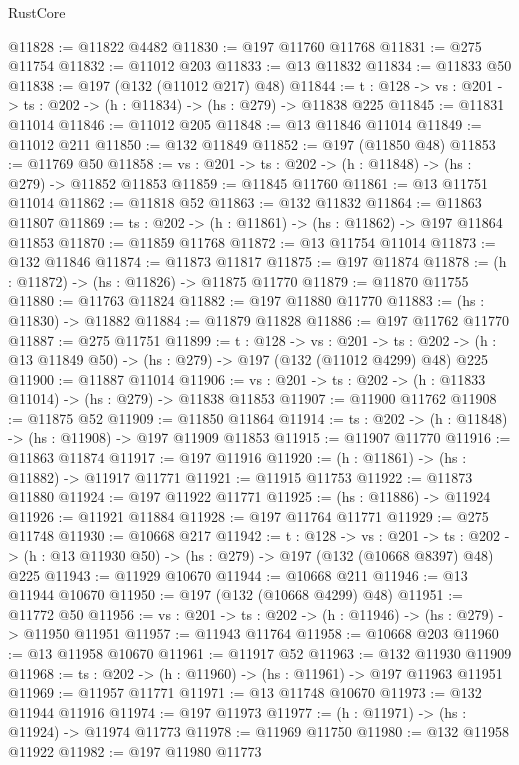 \begin{lexlean}{RustCore}
\begin{coremodule}
@11828 := @11822 @4482
@11830 := @197 @11760 @11768
@11831 := @275 @11754
@11832 := @11012 @203
@11833 := @13 @11832
@11834 := @11833 @50
@11838 := @197 (@132 (@11012 @217) @48)
@11844 := {t : @128} -> {vs : @201} -> {ts : @202} -> (h : @11834) -> (hs : @279) -> @11838 @225
@11845 := @11831 @11014
@11846 := @11012 @205
@11848 := @13 @11846 @11014
@11849 := @11012 @211
@11850 := @132 @11849
@11852 := @197 (@11850 @48)
@11853 := @11769 @50
@11858 := {vs : @201} -> {ts : @202} -> (h : @11848) -> (hs : @279) -> @11852 @11853
@11859 := @11845 @11760
@11861 := @13 @11751 @11014
@11862 := @11818 @52
@11863 := @132 @11832
@11864 := @11863 @11807
@11869 := {ts : @202} -> (h : @11861) -> (hs : @11862) -> @197 @11864 @11853
@11870 := @11859 @11768
@11872 := @13 @11754 @11014
@11873 := @132 @11846
@11874 := @11873 @11817
@11875 := @197 @11874
@11878 := (h : @11872) -> (hs : @11826) -> @11875 @11770
@11879 := @11870 @11755
@11880 := @11763 @11824
@11882 := @197 @11880 @11770
@11883 := (hs : @11830) -> @11882
@11884 := @11879 @11828
@11886 := @197 @11762 @11770
@11887 := @275 @11751
@11899 := {t : @128} ->
  {vs : @201} ->
  {ts : @202} -> (h : @13 @11849 @50) -> (hs : @279) -> @197 (@132 (@11012 @4299) @48) @225
@11900 := @11887 @11014
@11906 := {vs : @201} -> {ts : @202} -> (h : @11833 @11014) -> (hs : @279) -> @11838 @11853
@11907 := @11900 @11762
@11908 := @11875 @52
@11909 := @11850 @11864
@11914 := {ts : @202} -> (h : @11848) -> (hs : @11908) -> @197 @11909 @11853
@11915 := @11907 @11770
@11916 := @11863 @11874
@11917 := @197 @11916
@11920 := (h : @11861) -> (hs : @11882) -> @11917 @11771
@11921 := @11915 @11753
@11922 := @11873 @11880
@11924 := @197 @11922 @11771
@11925 := (hs : @11886) -> @11924
@11926 := @11921 @11884
@11928 := @197 @11764 @11771
@11929 := @275 @11748
@11930 := @10668 @217
@11942 := {t : @128} ->
  {vs : @201} ->
  {ts : @202} -> (h : @13 @11930 @50) -> (hs : @279) -> @197 (@132 (@10668 @8397) @48) @225
@11943 := @11929 @10670
@11944 := @10668 @211
@11946 := @13 @11944 @10670
@11950 := @197 (@132 (@10668 @4299) @48)
@11951 := @11772 @50
@11956 := {vs : @201} -> {ts : @202} -> (h : @11946) -> (hs : @279) -> @11950 @11951
@11957 := @11943 @11764
@11958 := @10668 @203
@11960 := @13 @11958 @10670
@11961 := @11917 @52
@11963 := @132 @11930 @11909
@11968 := {ts : @202} -> (h : @11960) -> (hs : @11961) -> @197 @11963 @11951
@11969 := @11957 @11771
@11971 := @13 @11748 @10670
@11973 := @132 @11944 @11916
@11974 := @197 @11973
@11977 := (h : @11971) -> (hs : @11924) -> @11974 @11773
@11978 := @11969 @11750
@11980 := @132 @11958 @11922
@11982 := @197 @11980 @11773

\end{coremodule}
\end{lexlean}
